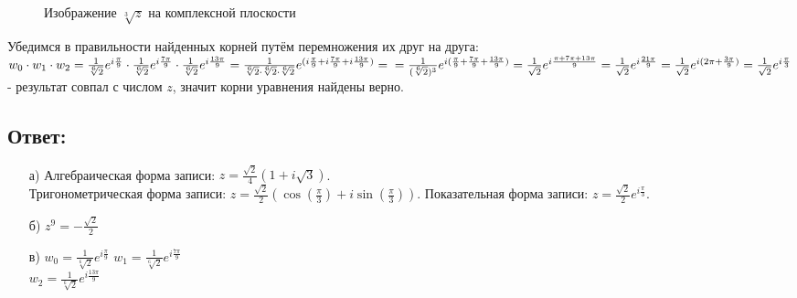 \documentclass[12pt, a4paper]{article}
\begin{document}
\begin{enumerate}
\begin{figure}[h]
                \caption{Изображение $\sqrt[3]{z}$ на комплексной плоскости}
            \end{figure}
            Убедимся в правильности найденных корней путём перемножения их
            друг на друга:\\
            \begin{math}
                w_0 \cdot w_1 \cdot w_2 = \frac{1}{\sqrt[6]{2}}e^{i\frac{\pi}{9}} \cdot
                \frac{1}{\sqrt[6]{2}}e^{i\frac{7\pi}{9}} \cdot
                \frac{1}{\sqrt[6]{2}}e^{i\frac{13\pi}{9}} = 
                \frac{1}{\sqrt[6]{2}\cdot\sqrt[6]{2}\cdot\sqrt[6]{2}}
                e^{(i\frac{\pi}{9} + i\frac{7\pi}{9} + i\frac{13\pi}{9})} = \\ =
                \frac{1}{(\sqrt[6]{2})^3}e^{i(\frac{\pi}{9} + \frac{7\pi}{9} + \frac{13\pi}{9})} = 
                \frac{1}{\sqrt{2}}e^{i\frac{\pi + 7\pi + 13\pi}{9}} = 
                \frac{1}{\sqrt{2}}e^{i\frac{21\pi}{9}} = 
                \frac{1}{\sqrt{2}}e^{i(2\pi + \frac{3\pi}{9})} = 
                \frac{1}{\sqrt{2}}e^{i\frac{\pi}{3}}
            \end{math}
            - результат совпал с числом $z$, значит корни уравнения найдены верно.      
    \end{enumerate}
    \subsection*{Ответ:}
    \begin{enumerate}
        \item [а)] 
        Алгебраическая форма записи: 
        $z = \frac{\sqrt{2}}{4}(1 + i\sqrt{3})$.\\
        Тригонометрическая форма записи: 
        $z = \frac{\sqrt{2}}{2}(\cos(\frac{\pi}{3}) + i\sin(\frac{\pi}{3}))$.\newline
        Показательная форма записи:
        $z = \frac{\sqrt{2}}{2}e^{i\frac{\pi}{3}}$.\\
        \item [б)] $z^9 = -\frac{\sqrt{2}}{2}$
        \item [в)] $w_0 = \frac{1}{\sqrt[6]{2}}e^{i\frac{\pi}{9}}$\newline
        $w_1 = \frac{1}{\sqrt[6]{2}}e^{i\frac{7\pi}{9}}$\\
        $w_2 = \frac{1}{\sqrt[6]{2}}e^{i\frac{13\pi}{9}}$\\
    \end{enumerate}
%
%
\end{document}
